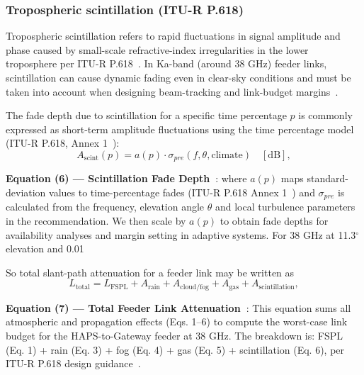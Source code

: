 \documentclass[conference]{IEEEtran}
\begin{document}
\subsubsection{Tropospheric scintillation (ITU-R P.618\texorpdfstring{\cite{itu_p618}}{[ITU-R P.618]})}
Tropospheric scintillation refers to rapid fluctuations in signal amplitude and
phase caused by small-scale refractive-index irregularities in the lower
troposphere per ITU-R P.618~\cite{itu_p618}. In Ka-band (around 38 GHz) feeder links, scintillation can cause
dynamic fading even in clear-sky conditions and must be taken into account when
designing beam-tracking and link-budget margins~\cite{itu_p618}.

The fade depth due to scintillation for a specific time percentage $p$ is
commonly expressed as short-term amplitude fluctuations using the time percentage model (ITU-R P.618, Annex 1~\cite{itu_p618}):
\begin{equation}
A_\mathrm{scint}(p) = a(p) \cdot \sigma_{pre}(f,\theta,\mathrm{climate}) \quad [\mathrm{dB}],
\label{eq:scint_loss}
\end{equation}

\noindent\textbf{Equation (6) --- Scintillation Fade Depth~\cite{itu_p618}}: where $a(p)$ maps standard-deviation values to time-percentage fades (ITU-R P.618 Annex 1~\cite{itu_p618})
and $\sigma_{pre}$ is calculated from the frequency, elevation angle $\theta$ and
local turbulence parameters in the recommendation. We then scale by $a(p)$ to obtain fade depths
for availability analyses and margin setting in adaptive systems. For 38 GHz at 11.3$^\circ$ elevation
and 0.01%

So total slant-path attenuation for a feeder link may be written as
\begin{equation}
L_\mathrm{total} = L_\mathrm{FSPL} + A_\mathrm{rain} + A_\mathrm{cloud/fog}
                  + A_\mathrm{gas} + A_\mathrm{scintillation},
\label{eq:feeder_loss}
\end{equation}

\noindent\textbf{Equation (7) --- Total Feeder Link Attenuation~\cite{itu_p618}}: This equation sums all atmospheric and propagation effects (Eqs. 1--6) to compute the worst-case link budget for the HAPS-to-Gateway feeder at 38 GHz. The breakdown is: FSPL (Eq. 1) + rain (Eq. 3) + fog (Eq. 4) + gas (Eq. 5) + scintillation (Eq. 6), per ITU-R P.618 design guidance~\cite{itu_p618}.
\end{document}
